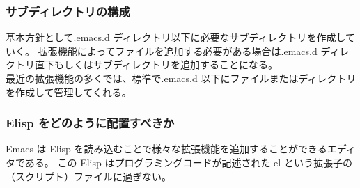 \subsubsection{サブディレクトリの構成}
基本方針として.emacs.d ディレクトリ以下に必要なサブディレクトリを作成していく。
拡張機能によってファイルを追加する必要がある場合は.emacs.d ディレクトリ直下もしくはサブディレクトリを追加することになる。\\

最近の拡張機能の多くでは、標準で.emacs.d 以下にファイルまたはディレクトリを作成して管理してくれる。
\subsubsection{Elisp をどのように配置すべきか}
Emacs は Elisp を読み込むことで様々な拡張機能を追加することができるエディタである。
この Elisp はプログラミングコードが記述された el という拡張子の（スクリプト）ファイルに過ぎない。\\

